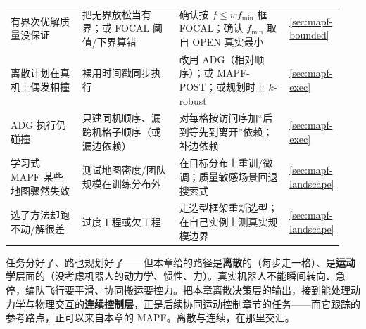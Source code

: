 \begin{table}[H]
\begin{tabular}{p{0.22\linewidth}p{0.30\linewidth}p{0.34\linewidth}p{0.08\linewidth}}
有界次优解质量没保证 & 把无界放松当有界；或 FOCAL 阈值/下界算错 & 确认按 $f\le w f_{\min}$ 框 FOCAL；确认 $f_{\min}$ 取自 OPEN 真实最小 & \cref{sec:mapf-bounded} \\
离散计划在真机上偶发相撞 & 裸用时间戳同步执行 & 改用 ADG（相对顺序）；或 MAPF-POST；或规划时上 $k$-robust & \cref{sec:mapf-exec} \\
ADG 执行仍碰撞 & 只建同机顺序、漏跨机格子顺序（或漏边依赖） & 对每格按访问序加“后到等先到离开”依赖；补边依赖 & \cref{sec:mapf-exec} \\
学习式 MAPF 某些地图骤然失效 & 测试地图密度/团队规模在训练分布外 & 在目标分布上重训/微调；质量敏感场景回退搜索式 & \cref{sec:mapf-landscape} \\
选了方法却跑不动/解很差 & 过度工程或欠工程 & 走选型框架重新选型；在自己实例上测真实规模边界 & \cref{sec:mapf-landscape} \\
\bottomrule
\end{tabular}
\end{table}

\begin{note}
任务分好了、路也规划好了——但本章给的路径是\textbf{离散}的（每步走一格）、是\textbf{运动学}层面的（没考虑机器人的动力学、惯性、力）。真实机器人不能瞬间转向、急停，编队飞行要平滑、协同搬运要控力。把本章离散决策层的输出，接到能处理动力学与物理交互的\textbf{连续控制层}，正是后续协同运动控制章节的任务——而它跟踪的参考路点，正可以来自本章的 MAPF。离散与连续，在那里交汇。
\end{note}
